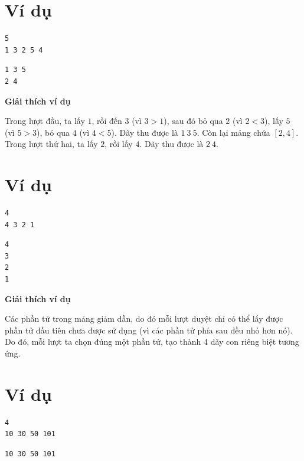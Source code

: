 \documentclass[12pt,a4paper]{article}
\newcommand{\explanation}{%
  \vspace{6pt}\textbf{\textcolor{sectioncolor}{Giải thích ví dụ}}\par\vspace{2pt}%
}
\begin{document}
\section*{Ví dụ}
\begin{inputbox}
\begin{lstlisting}
5
1 3 2 5 4
\end{lstlisting}
\end{inputbox}
\begin{outputbox}
\begin{lstlisting}
1 3 5 
2 4 
\end{lstlisting}
\end{outputbox}

\explanation
Trong lượt đầu, ta lấy $1$, rồi đến $3$ (vì $3 > 1$), sau đó bỏ qua $2$ (vì $2 < 3$), lấy $5$ (vì $5 > 3$), bỏ qua $4$ (vì $4 < 5$). Dãy thu được là $1\ 3\ 5$.
Còn lại mảng chứa $[2, 4]$. Trong lượt thứ hai, ta lấy $2$, rồi lấy $4$. Dãy thu được là $2\ 4$.

\section*{Ví dụ}
\begin{inputbox}
\begin{lstlisting}
4
4 3 2 1
\end{lstlisting}
\end{inputbox}
\begin{outputbox}
\begin{lstlisting}
4 
3 
2 
1 
\end{lstlisting}
\end{outputbox}

\explanation
Các phần tử trong mảng giảm dần, do đó mỗi lượt duyệt chỉ có thể lấy được phần tử đầu tiên chưa được sử dụng (vì các phần tử phía sau đều nhỏ hơn nó). Do đó, mỗi lượt ta chọn đúng một phần tử, tạo thành 4 dãy con riêng biệt tương ứng.

\section*{Ví dụ}
\begin{inputbox}
\begin{lstlisting}
4
10 30 50 101
\end{lstlisting}
\end{inputbox}
\begin{outputbox}
\begin{lstlisting}
10 30 50 101 
\end{lstlisting}
\end{outputbox}
\end{document}
